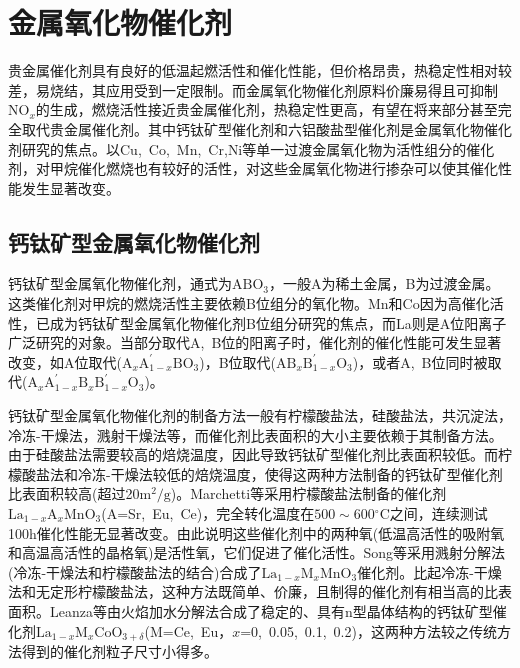 \section{金属氧化物催化剂}
贵金属催化剂具有良好的低温起燃活性和催化性能，但价格昂贵，热稳定性相对较差，易烧结，其应用受到一定限制。而金属氧化物催化剂原料价廉易得且可抑制$\mathrm{NO}_x$的生成，燃烧活性接近贵金属催化剂，热稳定性更高，有望在将来部分甚至完全取代贵金属催化剂。其中钙钛矿型催化剂和六铝酸盐型催化剂是金属氧化物催化剂研究的焦点。以\textrm{Cu},~\textrm{Co},~\textrm{Mn},~\textrm{Cr},\textrm{Ni}等单一过渡金属氧化物为活性组分的催化剂，对甲烷催化燃烧也有较好的活性，对这些金属氧化物进行掺杂可以使其催化性能发生显著改变。

\subsection{钙钛矿型金属氧化物催化剂}
钙钛矿型金属氧化物催化剂，通式为$\mathrm{ABO}_3$，一般\textrm{A}为稀土金属，\textrm{B}为过渡金属。这类催化剂对甲烷的燃烧活性主要依赖\textrm{B}位组分的氧化物。\textrm{Mn}\cite{ACB24-193_2000}和\textrm{Co}因为高催化活性，已成为钙钛矿型金属氧化物催化剂B位组分研究的焦点，而\textrm{La}\cite{ACA262-167_2004}则是\textrm{A}位阳离子广泛研究的对象。当部分取代\textrm{A},~\textrm{B}位的阳离子时，催化剂的催化性能可发生显著改变，如\textrm{A}位取代($\mathrm{A}_x\mathrm{A}^{\prime}_{1-x}\mathrm{BO}_3$)，\textrm{B}位取代($\mathrm{AB}_x\mathrm{B}^{\prime}_{1-x}\mathrm{O}_3$)，或者\textrm{A},~\textrm{B}位同时被取代($\mathrm{A}_x\mathrm{A}^{\prime}_{1-x}\mathrm{B}_x\mathrm{B}^{\prime}_{1-x}\mathrm{O}_3$)。

钙钛矿型金属氧化物催化剂的制备方法一般有柠檬酸盐法，硅酸盐法，共沉淀法，冷冻-干燥法，溅射干燥法等，而催化剂比表面积的大小主要依赖于其制备方法。由于硅酸盐法需要较高的焙烧温度，因此导致钙钛矿型催化剂比表面积较低。而柠檬酸盐法和冷冻-干燥法较低的焙烧温度，使得这两种方法制备的钙钛矿型催化剂比表面积较高(超过20$\mathrm{m}^2/\mathrm{g}$)。\textrm{Marchetti}等\cite{ACB15-179_1998}采用柠檬酸盐法制备的催化剂$\mathrm{La}_{1-x}\mathrm{A}_x\mathrm{MnO}_3$(\textrm{A=Sr,~Eu,~Ce})，完全转化温度在$500\sim$600$^{\circ}\mathrm{C}$之间，连续测试100\textrm{h}催化性能无显著改变。由此说明这些催化剂中的两种氧(低温高活性的吸附氧和高温高活性的晶格氧)是活性氧，它们促进了催化活性。\textrm{Song}等\cite{CataT47-155_1999}采用溅射分解法(冷冻-干燥法和柠檬酸盐法的结合)合成了$\mathrm{La}_{1-x}\mathrm{M}_x\mathrm{MnO}_3$催化剂。比起冷冻-干燥法和无定形柠檬酸盐法，这种方法既简单、价廉，且制得的催化剂有相当高的比表面积。\textrm{Leanza}等\cite{ACB28-55_2000}由火焰加水分解法合成了稳定的、具有\textrm{n}型晶体结构的钙钛矿型催化剂$\mathrm{La}_{1-x}\mathrm{M}_x\mathrm{CoO}_{3+\delta}$(\textrm{M=Ce,~Eu}，$x$=0,~0.05,~0.1,~0.2)，这两种方法较之传统方法得到的催化剂粒子尺寸小得多。


